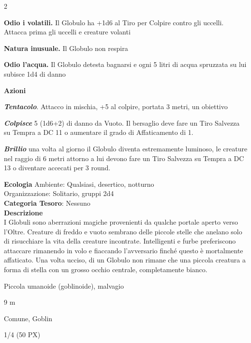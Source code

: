 \begin{multicols}{2}
{\textbf{Odio i volatili.} Il Globulo ha +1d6 al Tiro per Colpire contro gli uccelli. Attacca prima gli uccelli e creature volanti

\textbf{Natura inusuale.} Il Globulo non respira

\textbf{Odio l'acqua.} Il Globulo detesta bagnarsi e ogni 5 litri di acqua spruzzata su lui subisce 1d4 di danno

\textbf{Azioni}

\emph{\textbf{Tentacolo}}. Attacco in mischia, +5 al colpire, portata 3 metri, un obiettivo

\emph{\textbf{Colpisce}} 5 (1d6+2) di danno da Vuoto. Il bersaglio deve fare un Tiro Salvezza su Tempra a DC 11 o aumentare il grado di Affaticamento di 1.

\textbf{\emph{Brillio}} una volta al giorno il Globulo diventa estremamente luminoso, le creature nel raggio di 6 metri attorno a lui devono fare un Tiro Salvezza su Tempra a DC 13 o diventare accecati per 3 round.

\textbf{Ecologia}
Ambiente: Qualsiasi, desertico, notturno\\
Organizzazione: Solitario, gruppi 2d4\\
\textbf{Categoria Tesoro}: Nessuno\\
\textbf{Descrizione}\\
I Globuli sono aberrazioni magiche provenienti da qualche portale aperto verso l'Oltre. Creature di freddo e vuoto sembrano delle piccole stelle che anelano solo di risucchiare la vita della creature incontrate.
Intelligenti e furbe preferiscono attaccare rimanendo in volo e fiaccando l'avversario finché questo è mortalmente affaticato. Una volta ucciso, di un Globulo non rimane che una piccola creatura a forma di stella con un grosso occhio centrale, completamente bianco.

\begin{description}[noitemsep, topsep=0pt, parsep=0pt, partopsep=0pt, itemsep=1pt, leftmargin=2.35cm,  labelwidth=2.2cm, itemindent=0cm, listparindent=0pt] %
\setlength{\baselineskip}{10pt}
\item[\textbf{Taglia/Tipo}] Piccola umanoide (goblinoide), malvagio
\item[\textbf{Caratt.}] 
\item[\textbf{Punti Ferita}] 
\item[\textbf{Movimento}] 9 m
\item[\textbf{Tiri Salvez.}] 
\item[\textbf{Sensi}] 
\item[\textbf{Linguaggi}] Comune, Goblin
\item[\textbf{Sfida}] 1/4 (50 PX)
\end{description}
\smallskip

}
\end{multicols}
